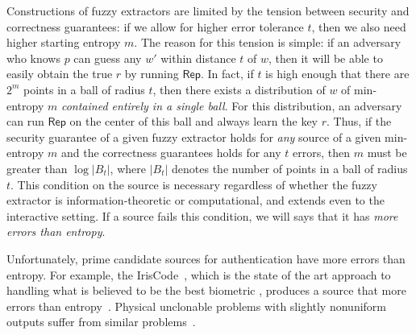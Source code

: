\documentclass[11pt]{article}
\newcommand{\class}[1]{{\ensuremath{\mathsf{#1}}}}
\newcommand{\rep}{\ensuremath{\class{Rep}}\xspace}
\newcommand{\Huse}{\mathrm{H}_{\mathtt{usable}}}
\begin{document}
Constructions of fuzzy extractors are limited by the tension between security and correctness guarantees: if we allow for higher error tolerance $t$, then we also need higher starting entropy $m$. The reason for this tension is simple: if an adversary who knows $p$ can guess any $w'$ within distance $t$ of $w$, then it will be able to easily obtain the true $r$ by running $\rep$.
In fact, if $t$ is high enough that there are $2^m$ points in a ball of radius $t$, then there exists a distribution of $w$ of min-entropy $m$  \emph{contained entirely in a single ball}.  For this distribution, an adversary can run $\rep$ on the center of this ball and always learn the key $r$.
Thus, if the security guarantee of a given fuzzy extractor holds for \emph{any} source of a given min-entropy $m$ and the correctness guarantees holds for any $t$ errors, then $m$ must   be greater than $\log |B_t|$, where $|B_t|$ denotes the number of points in a ball of radius $t$.  This condition on the source is necessary regardless of whether the fuzzy extractor is information-theoretic or computational, and extends even to the interactive setting.
If a source fails this condition, we will says that it has \emph{more errors than entropy}.




Unfortunately, prime candidate sources for authentication have more errors than entropy. 
For example, the IrisCode~\cite{daugman2004}, which is the state of the art approach to handling what is believed to be the best biometric \cite{prabhakar2003biometric}, produces a source that more errors than entropy~\cite[Section 5]{blanton2009biometric}. Physical unclonable problems with slightly nonuniform outputs suffer from similar problems~\cite{koeberl2014entropy}. 
\end{document}
